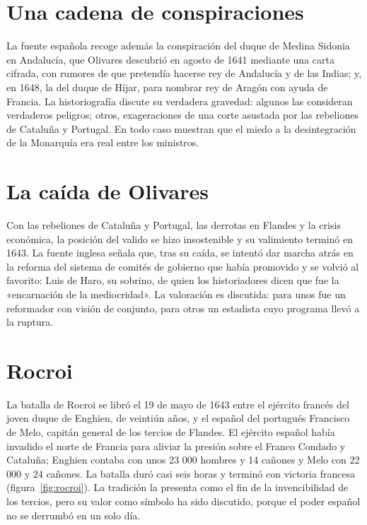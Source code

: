 \documentclass{book}
\begin{document}
\section{Una cadena de conspiraciones}

La fuente española recoge además la conspiración del duque de Medina Sidonia en Andalucía, que Olivares descubrió en agosto de 1641 mediante una carta cifrada, con rumores de que pretendía hacerse rey de Andalucía y de las Indias; y, en 1648, la del duque de Híjar, para nombrar rey de Aragón con ayuda de Francia. La historiografía discute su verdadera gravedad: algunos las consideran verdaderos peligros; otros, exageraciones de una corte asustada por las rebeliones de Cataluña y Portugal. En todo caso muestran que el miedo a la desintegración de la Monarquía era real entre los ministros.


\section{La caída de Olivares}

Con las rebeliones de Cataluña y Portugal, las derrotas en Flandes y la crisis económica, la posición del valido se hizo insostenible y su valimiento terminó en 1643. La fuente inglesa señala que, tras su caída, se intentó dar marcha atrás en la reforma del sistema de comités de gobierno que había promovido y se volvió al favorito: Luis de Haro, su sobrino, de quien los historiadores dicen que fue la «encarnación de la mediocridad».  La valoración es discutida: para unos fue un reformador con visión de conjunto, para otros un estadista cuyo programa llevó a la ruptura.


\section{Rocroi}

La batalla de Rocroi se libró el 19 de mayo de 1643 entre el ejército francés del joven duque de Enghien, de veintiún años, y el español del portugués Francisco de Melo, capitán general de los tercios de Flandes. El ejército español había invadido el norte de Francia para aliviar la presión sobre el Franco Condado y Cataluña; Enghien contaba con unos 23 000 hombres y 14 cañones y Melo con 22 000 y 24 cañones. La batalla duró casi seis horas y terminó con victoria francesa (figura~\ref{fig:rocroi}). La tradición la presenta como el fin de la invencibilidad de los tercios, pero su valor como símbolo ha sido discutido, porque el poder español no se derrumbó en un solo día.
\end{document}
